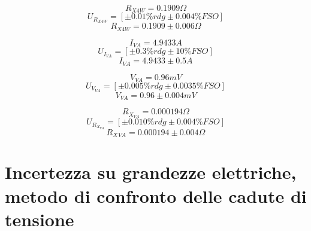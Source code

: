 \documentclass[a4paper]{article}
\begin{document}
\begin{Large}
	\begin{equation}
		R_{X4W}= 0.1909 \Omega
	\end{equation}
	\begin{equation}
		U_{R_{X4W}} = [\pm 0.01\%rdg \pm 0.004\% FSO]
	 \end{equation}
	 \begin{equation}
		R_{X4W} = 0.1909\pm 0.006 \Omega
	 \end{equation}
\end{Large}

\begin{Large}
	\begin{equation}
		I_{VA}= 4.9433 A
	\end{equation}
	\begin{equation}
		U_{I_{VA}} = [\pm 0.3\%rdg \pm 10\% FSO]
	 \end{equation}
	 \begin{equation}
		I_{VA} = 4.9433 \pm 0.5 A
	 \end{equation}
\end{Large}

\begin{Large}
	\begin{equation}
		V_{VA}= 0.96 mV
	\end{equation}
	\begin{equation}
		U_{V_{VA}} = [\pm 0.005\%rdg \pm 0.0035\% FSO]
	 \end{equation}
	 \begin{equation}
		V_{VA} = 0.96 \pm 0.004 mV
	 \end{equation}
\end{Large}

\begin{Large}
	\begin{equation}
		R_{X_{VA}}= 0.000194 \Omega
	\end{equation}
	\begin{equation}
		U_{R_{X_{VA}}} = [\pm 0.010\%rdg \pm 0.004\% FSO]
	 \end{equation}
	 \begin{equation}
		R_X{_{VA}} = 0.000194 \pm 0.004 \Omega
	 \end{equation}
\end{Large}

\section {Incertezza su grandezze elettriche, metodo di confronto delle cadute di tensione}
\end{document}
